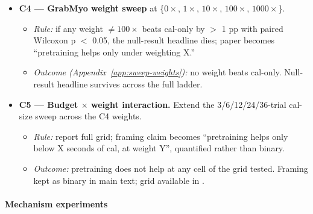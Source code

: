 \documentclass{article}
\begin{document}
\begin{itemize}
\begin{itemize}
  \end{itemize}
  \item \textbf{C4 --- GrabMyo weight sweep} at \{$0\times$, $1\times$, $10\times$, $100\times$, $1000\times$\}.
  \begin{itemize}
    \item \emph{Rule:} if any weight $\neq 100\times$ beats cal-only by $>$ 1 pp with paired Wilcoxon p $<$ 0.05, the null-result headline dies; paper becomes ``pretraining helps only under weighting X.''
    \item \emph{Outcome (Appendix~\ref{app:sweep-weights}):} no weight beats cal-only. Null-result headline survives across the full ladder.
  \end{itemize}
  \item \textbf{C5 --- Budget $\times$ weight interaction.} Extend the 3/6/12/24/36-trial cal-size sweep across the C4 weights.
  \begin{itemize}
    \item \emph{Rule:} report full grid; framing claim becomes ``pretraining helps only below X seconds of cal, at weight Y'', quantified rather than binary.
    \item \emph{Outcome:} pretraining does not help at any cell of the grid tested. Framing kept as binary in main text; grid available in .
  \end{itemize}
\end{itemize}

\paragraph{Mechanism experiments}
\end{document}
